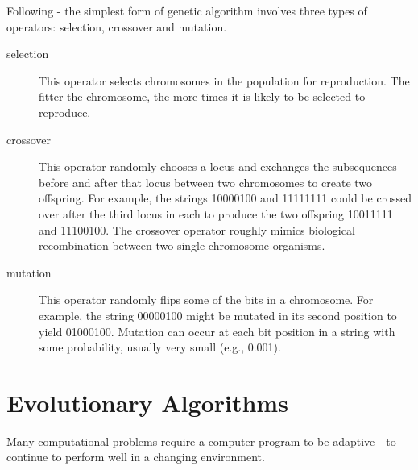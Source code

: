 Following \cite{Mitchell01} - the simplest form of genetic algorithm involves three types of operators: selection, crossover and mutation. 

\begin{description}

\item[selection]
  This operator selects chromosomes in the population for reproduction.
  The fitter the chromosome, the more times it is likely to be selected to reproduce.
  
\item[crossover]
  This operator randomly chooses a locus and exchanges the subsequences before and after that locus between two chromosomes to create two offspring.
  For example, the strings 10000100 and 11111111 could be crossed over after the third locus in each to produce the two offspring 10011111 and 11100100.
  The crossover operator roughly mimics biological recombination between two single-chromosome organisms.

\item[mutation]
  This operator randomly flips some of the bits in a chromosome.
  For example, the string 00000100 might be mutated in its second position to yield 01000100.
  Mutation can occur at each bit position in a string with some probability, usually very small (e.g., 0.001).


\end{description}


\section{Evolutionary Algorithms}
\label{sec:evolAlgorithms}

Many computational problems require a computer program to be adaptive—to continue to perform well in a
changing environment.

